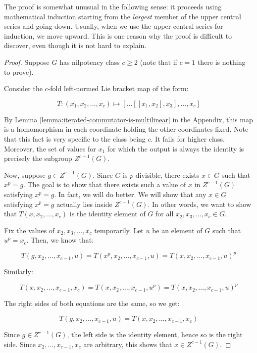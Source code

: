 The proof is somewhat unusual in the following sense: it proceeds
using mathematical induction starting from the {\em largest} member of
the upper central series and going down. Usually, when we use the
upper central series for induction, we move upward. This is one reason
why the proof is difficult to discover, even though it is not hard to
explain.

\begin{proof}
  Suppose $G$ has nilpotency class $c \ge 2$ (note that if $c = 1$
  there is nothing to prove).

  Consider the $c$-fold left-normed Lie bracket map of the form:

  $$T:(x_1,x_2,\dots,x_c) \mapsto [\dots [[x_1,x_2],x_3],\dots,x_c]$$

  By Lemma \ref{lemma:iterated-commutator-is-multilinear} in the
  Appendix, this map is a homomorphism in each coordinate holding the
  other coordinates fixed. Note that this fact is very specific to the
  class being $c$. It fails for higher class. Moreover, the set of
  values for $x_1$ for which the output is always the identity is
  precisely the subgroup $Z^{c-1}(G)$.

  Now, suppose $g \in Z^{c-1}(G)$. Since $G$ is $p$-divisible, there
  exists $x \in G$ such that $x^p = g$. The goal is to show that there
  exists such a value of $x$ in $Z^{c-1}(G)$ satisfying $x^p = g$. In
  fact, we will do better. We will show that any $x \in G$ satisfying
  $x^p = g$ actually lies inside $Z^{c-1}(G)$. In other words, we want
  to show that $T(x,x_2,\dots,x_c)$ is the identity element of $G$ for
  all $x_2,x_3,\dots,x_c \in G$.

  Fix the values of $x_2,x_3,\dots,x_c$ temporarily. Let $u$ be an
  element of $G$ such that $u^p = x_c$. Then, we know that:

  $$T(g,x_2,\dots,x_{c-1},u) = T(x^p,x_2,\dots,x_{c-1},u) = T(x,x_2,\dots,x_{c-1},u)^p$$

  Similarly:

  $$T(x,x_2,\dots,x_{c-1},x_c) = T(x,x_2,\dots,x_{c-1},u^p) = T(x,x_2,\dots,x_{c-1},u)^p$$

  The right sides of both equations are the same, so we get:

  $$T(g,x_2,\dots,x_{c-1},u) = T(x,x_2,\dots,x_{c-1},x_c)$$

  Since $g \in Z^{c-1}(G)$, the left side is the identity element,
  hence so is the right side. Since $x_2,\dots,x_{c-1},x_c$ are
  arbitrary, this shows that $x \in Z^{c-1}(G)$.


\end{proof}
